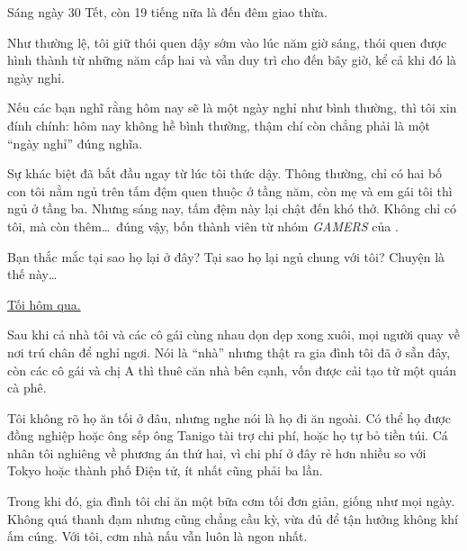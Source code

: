 \documentclass[../main.tex]{subfiles}
\begin{document}

Sáng ngày 30 Tết, còn 19 tiếng nữa là đến đêm giao thừa.

Như thường lệ, tôi giữ thói quen dậy sớm vào lúc năm giờ sáng, thói quen được hình thành từ những năm cấp hai và vẫn duy trì cho đến bây giờ, kể cả khi đó là ngày nghỉ.

Nếu các bạn nghĩ rằng hôm nay sẽ là một ngày nghỉ như bình thường, thì tôi xin đính chính: hôm nay không hề bình thường, thậm chí còn chẳng phải là một ``ngày nghỉ'' đúng nghĩa.

Sự khác biệt đã bắt đầu ngay từ lúc tôi thức dậy. Thông thường, chỉ có hai bố con tôi nằm ngủ trên tấm đệm quen thuộc ở tầng năm, còn mẹ và em gái tôi thì ngủ ở tầng ba. Nhưng sáng nay, tấm đệm này lại chật đến khó thở. Không chỉ có tôi, mà còn thêm\dots\ đúng vậy, bốn thành viên từ nhóm \textit{GAMERS} của \hll.

Bạn thắc mắc tại sao họ lại ở đây? Tại sao họ lại ngủ chung với tôi? Chuyện là thế này\dots

\begin{center}
    \uline{Tối hôm qua.}
\end{center}

Sau khi cả nhà tôi và các cô gái cùng nhau dọn dẹp xong xuôi, mọi người quay về nơi trú chân để nghỉ ngơi. Nói là ``nhà'' nhưng thật ra gia đình tôi đã ở sẵn đây, còn các cô gái và chị A thì thuê căn nhà bên cạnh, vốn được cải tạo từ một quán cà phê.

Tôi không rõ họ ăn tối ở đâu, nhưng nghe nói là họ đi ăn ngoài. Có thể họ được đồng nghiệp hoặc ông sếp ông Tanigo tài trợ chi phí, hoặc họ tự bỏ tiền túi. Cá nhân tôi nghiêng về phương án thứ hai, vì chi phí ở đây rẻ hơn nhiều so với Tokyo hoặc thành phố Điện tử, ít nhất cũng phải ba lần.

Trong khi đó, gia đình tôi chỉ ăn một bữa cơm tối đơn giản, giống như mọi ngày. Không quá thanh đạm nhưng cũng chẳng cầu kỳ, vừa đủ để tận hưởng không khí ấm cúng. Với tôi, cơm nhà nấu vẫn luôn là ngon nhất.
\end{document}
